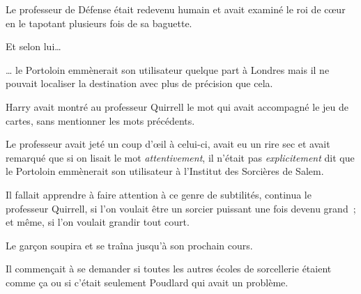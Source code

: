 Le professeur de Défense était redevenu humain et avait examiné le roi de cœur en le tapotant plusieurs fois de sa baguette.

Et selon lui…

… le Portoloin emmènerait son utilisateur quelque part à Londres mais il ne pouvait localiser la destination avec plus de précision que cela.

Harry avait montré au professeur Quirrell le mot qui avait accompagné le jeu de cartes, sans mentionner les mots précédents.

Le professeur avait jeté un coup d'œil à celui-ci, avait eu un rire sec et avait remarqué que si on lisait le mot \emph{attentivement}, il n'était pas \emph{explicitement} dit que le Portoloin emmènerait son utilisateur à l'Institut des Sorcières de Salem.

Il fallait apprendre à faire attention à ce genre de subtilités, continua le professeur Quirrell, si l'on voulait être un sorcier puissant une fois devenu grand~; et même, si l'on voulait grandir tout court.

Le garçon soupira et se traîna jusqu'à son prochain cours.

Il commençait à se demander si toutes les autres écoles de sorcellerie étaient comme ça ou si c'était seulement Poudlard qui avait un problème. 

